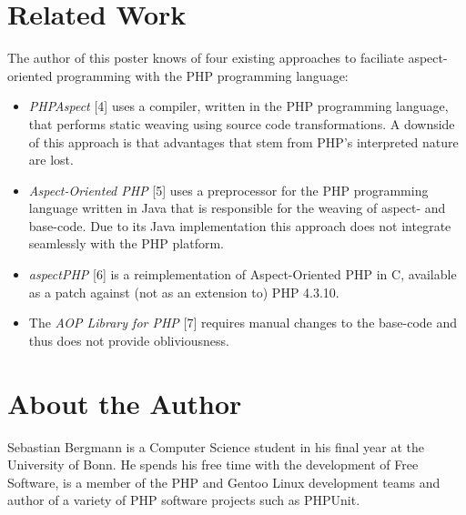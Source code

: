 \documentclass[landscape,a0]{a0poster}
\begin{document}
\begin{poster}
\begin{pcolumn}
\begin{pbox}
\section{Related Work}
\large
  The author of this poster knows of four existing approaches to faciliate
  aspect-oriented programming with the PHP programming language:

  \begin{itemize}

    \item

      \emph{PHPAspect} [4] uses a compiler, written in the PHP programming
      language, that performs static weaving using source code transformations.
      A downside of this approach is that advantages that stem from PHP's
      interpreted nature are lost.

    \item

      \emph{Aspect-Oriented PHP} [5] uses a preprocessor for the PHP programming
      language written in Java that is responsible for the weaving of aspect- and
      base-code. Due to its Java implementation this approach does not integrate
      seamlessly with the PHP platform.

    \item

      \emph{aspectPHP} [6] is a reimplementation of Aspect-Oriented PHP in C,
      available as a patch against (not as an extension to) PHP 4.3.10.

    \item

      The \emph{AOP Library for PHP} [7] requires manual changes to the base-code
      and thus does not provide obliviousness.

  \end{itemize}

\section{About the Author}
Sebastian Bergmann is a Computer Science student in his final year at the University of Bonn.
He spends his free time with the development of Free Software, is a member of the PHP and Gentoo Linux development teams and author of a variety of PHP software projects such as PHPUnit.


\end{pbox}
\end{pcolumn}
\end{poster}
\end{document}
